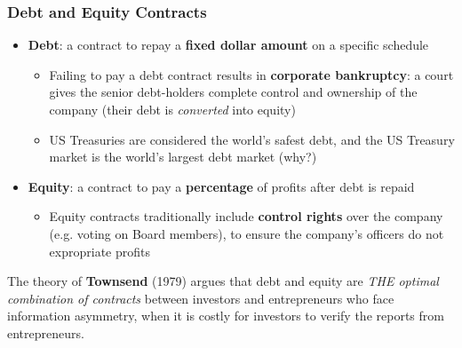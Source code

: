 \documentclass[aspectratio=169]{beamer}
\begin{document}
\begin{frame}
\frametitle{Debt and Equity Contracts}

\begin{itemize}
    \item \textbf{Debt}: a contract to repay a \textbf{fixed dollar amount} on a specific schedule 
    \begin{itemize}
        \item Failing to pay a debt contract results in \textbf{corporate bankruptcy}: a court gives the senior debt-holders complete control and ownership of the company (their debt is \emph{converted} into equity)  \pause 
        \item US Treasuries are considered the world's safest debt, and the US Treasury market is the world's largest debt market (why?) \pause 
    \end{itemize}

    \item \textbf{Equity}: a contract to pay a \textbf{percentage} of profits after debt is repaid 
    \begin{itemize}
        \item Equity contracts traditionally include \textbf{control rights} over the company (e.g. voting on Board members), to ensure the company's officers do not expropriate profits 
    \end{itemize}
\end{itemize}\pause \smallskip 

The theory of \textbf{Townsend} (1979) argues that debt and equity are \emph{THE optimal combination of contracts} between investors and entrepreneurs who face information asymmetry, when it is costly for investors to verify the reports from entrepreneurs. 

\end{frame}
\end{document}
